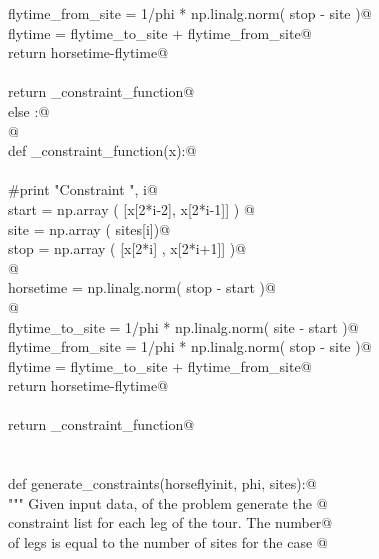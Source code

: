 \documentclass[11.5pt]{report}
\begin{document}
\begin{flushleft}
\begin{list}{}{}
\mbox{}\verb@                flytime_from_site = 1/phi * np.linalg.norm( stop - site  )@\\
\mbox{}\verb@                flytime           = flytime_to_site + flytime_from_site@\\
\mbox{}\verb@                return horsetime-flytime@\\
\mbox{}\verb@@\\
\mbox{}\verb@            return _constraint_function@\\
\mbox{}\verb@        else :@\\
\mbox{}\verb@          @\\
\mbox{}\verb@            def _constraint_function(x):@\\
\mbox{}\verb@@\\
\mbox{}\verb@               #print "Constraint  ", i@\\
\mbox{}\verb@               start = np.array (  [x[2*i-2], x[2*i-1]]  ) @\\
\mbox{}\verb@               site  = np.array (  sites[i])@\\
\mbox{}\verb@               stop  = np.array (  [x[2*i]  , x[2*i+1]]  )@\\
\mbox{}\verb@            @\\
\mbox{}\verb@               horsetime = np.linalg.norm( stop - start )@\\
\mbox{}\verb@           @\\
\mbox{}\verb@               flytime_to_site   = 1/phi * np.linalg.norm( site - start )@\\
\mbox{}\verb@               flytime_from_site = 1/phi * np.linalg.norm( stop - site  )@\\
\mbox{}\verb@               flytime           = flytime_to_site + flytime_from_site@\\
\mbox{}\verb@               return horsetime-flytime@\\
\mbox{}\verb@@\\
\mbox{}\verb@            return _constraint_function@\\
\mbox{}\verb@@\\
\mbox{}\verb@@\\
\mbox{}\verb@    def generate_constraints(horseflyinit, phi, sites):@\\
\mbox{}\verb@        """ Given input data, of the problem generate the @\\
\mbox{}\verb@        constraint list for each leg of the tour. The number@\\
\mbox{}\verb@        of legs is equal to the number of sites for the case @\\

\end{list}
\end{flushleft}
\end{document}
